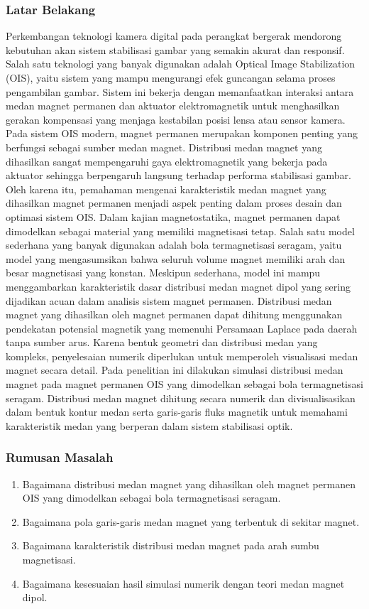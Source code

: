 \documentclass[11pt,a4paper]{article}
\begin{document}
\subsubsection{Latar Belakang}
Perkembangan teknologi kamera digital pada perangkat bergerak mendorong kebutuhan akan sistem stabilisasi gambar yang semakin akurat dan responsif. Salah satu teknologi yang banyak digunakan adalah Optical Image Stabilization (OIS), yaitu sistem yang mampu mengurangi efek guncangan selama proses pengambilan gambar. Sistem ini bekerja dengan memanfaatkan interaksi antara medan magnet permanen dan aktuator elektromagnetik untuk menghasilkan gerakan kompensasi yang menjaga kestabilan posisi lensa atau sensor kamera. Pada sistem OIS modern, magnet permanen merupakan komponen penting yang berfungsi sebagai sumber medan magnet. Distribusi medan magnet yang dihasilkan sangat mempengaruhi gaya elektromagnetik yang bekerja pada aktuator sehingga berpengaruh langsung terhadap performa stabilisasi gambar. Oleh karena itu, pemahaman mengenai karakteristik medan magnet yang dihasilkan magnet permanen menjadi aspek penting dalam proses desain dan optimasi sistem OIS. Dalam kajian magnetostatika, magnet permanen dapat dimodelkan sebagai material yang memiliki magnetisasi tetap. Salah satu model sederhana yang banyak digunakan adalah bola termagnetisasi seragam, yaitu model yang mengasumsikan bahwa seluruh volume magnet memiliki arah dan besar magnetisasi yang konstan. Meskipun sederhana, model ini mampu menggambarkan karakteristik dasar distribusi medan magnet dipol yang sering dijadikan acuan dalam analisis sistem magnet permanen. Distribusi medan magnet yang dihasilkan oleh magnet permanen dapat dihitung menggunakan pendekatan potensial magnetik yang memenuhi Persamaan Laplace pada daerah tanpa sumber arus. Karena bentuk geometri dan distribusi medan yang kompleks, penyelesaian numerik diperlukan untuk memperoleh visualisasi medan magnet secara detail. Pada penelitian ini dilakukan simulasi distribusi medan magnet pada magnet permanen OIS yang dimodelkan sebagai bola termagnetisasi seragam. Distribusi medan magnet dihitung secara numerik dan divisualisasikan dalam bentuk kontur medan serta garis-garis fluks magnetik untuk memahami karakteristik medan yang berperan dalam sistem stabilisasi optik.

\subsubsection{Rumusan Masalah}
\begin{enumerate}[itemsep=1pt,topsep=2pt]
\item Bagaimana distribusi medan magnet yang dihasilkan oleh magnet permanen OIS yang dimodelkan sebagai bola termagnetisasi seragam.
\item Bagaimana pola garis-garis medan magnet yang terbentuk di sekitar magnet.
\item Bagaimana karakteristik distribusi medan magnet pada arah sumbu magnetisasi.
\item Bagaimana kesesuaian hasil simulasi numerik dengan teori medan magnet dipol.
\end{enumerate}
\end{document}
